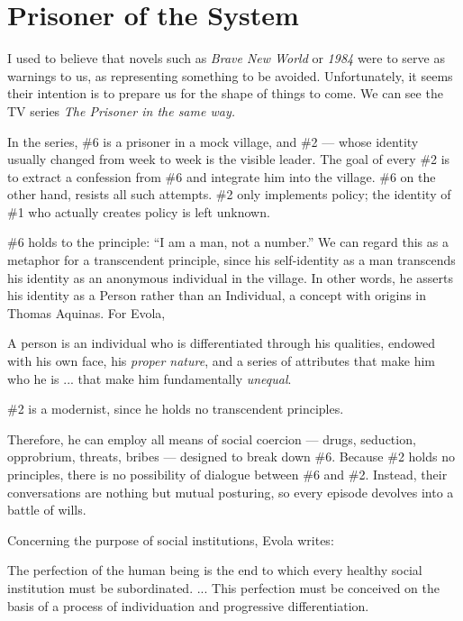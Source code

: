 \section{Prisoner of the System}

I used to believe that novels such as \emph{Brave New World} or \emph{1984} were to serve as warnings to us, as representing something to be avoided. Unfortunately, it seems their intention is to prepare us for the shape of things to come. We can see the TV series \emph{The Prisoner in the same way.}

In the series, \#6 is a prisoner in a mock village, and \#2 --- whose identity usually changed from week to week is the visible leader. The goal of every \#2 is to extract a confession from \#6 and integrate him into the village. \#6 on the other hand, resists all such attempts. \#2 only implements policy; the identity of \#1 who actually creates policy is left unknown.

\#6 holds to the principle: ``I am a man, not a number.'' We can regard this as a metaphor for a transcendent principle, since his self-identity as a man transcends his identity as an anonymous individual in the village. In other words, he asserts his identity as a Person rather than an Individual, a concept with origins in Thomas Aquinas. For Evola,

\begin{quotex}
A person is an individual who is differentiated through his qualities, endowed with his own face, his \emph{proper nature}, and a series of attributes that make him who he is ... that make him fundamentally \emph{unequal}.
\end{quotex}

\#2 is a modernist, since he holds no transcendent principles.

Therefore, he can employ all means of social coercion --- drugs, seduction, opprobrium, threats, bribes --- designed to break down \#6. Because \#2 holds no principles, there is no possibility of dialogue between \#6 and \#2. Instead, their conversations are nothing but mutual posturing, so every episode devolves into a battle of wills.

Concerning the purpose of social institutions, Evola writes:

\begin{quotex}
The perfection of the human being is the end to which every healthy social institution must be subordinated. ... This perfection must be conceived on the basis of a process of individuation and progressive differentiation.
\end{quotex}


